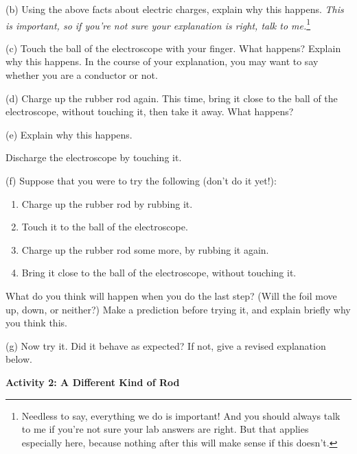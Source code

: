 \answerspace{1in}

(b) Using the above facts about electric charges, explain why this happens.  \textit{This is important, so if you're not sure your explanation is
right, talk to me.}\footnote{Needless to say, everything we do
is important! And you should always talk to me if you're not sure your
lab answers are right. But that applies especially here, because nothing
after this will make sense if this doesn't.}

\answerspace{1in}

\pagebreak[3]
(c) Touch the ball of the electroscope with your finger. What happens? Explain why this
happens.  In the course of your explanation, you may want to say
whether you are a conductor or not.

\answerspace{1.3in}

(d) Charge up the rubber rod again. This time, bring it close to the
ball of the electroscope, without touching it, then take it away.
What happens?

\answerspace{0.8in}

(e) Explain why this happens.

\answerspace{1in}

Discharge the electroscope by touching it.

(f) Suppose that you were to try the following (don't do it yet!):

\begin{enumerate}
\setlength\itemsep{-0pt}
\setlength\topsep{-6pt}
\setlength\partopsep{-6pt}
\vspace{-10 pt}
\item Charge up the rubber rod by rubbing it.
\item Touch it to the ball of the electroscope.
\item Charge up the rubber rod some more, by rubbing it again.
\item Bring it close to the ball of the electroscope, without
touching it.
\end{enumerate}
What do you think will happen when you do the last step? (Will the
foil move up, down, or neither?) Make a prediction before trying it,
and explain briefly why you think this.

\answerspace{1.7in}

(g) Now try it. Did it behave as expected?  If not, give a revised explanation below.

\answerspace{1in}

\pagebreak[2]
\textbf{Activity 2: A Different Kind of Rod}

